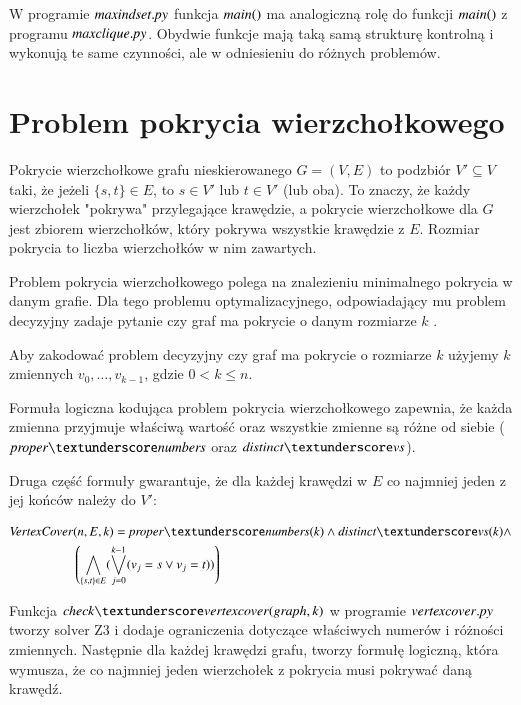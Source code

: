 

W programie ${\mathit{maxindset.py}}$ funkcja ${\mathit{main()}}$ ma analogiczną rolę do funkcji ${\mathit{main()}}$ z programu ${\mathit{maxclique.py}}$. Obydwie funkcje mają taką samą strukturę kontrolną i wykonują te same czynności, ale w odniesieniu do różnych problemów. 



\section{Problem pokrycia wierzchołkowego}
Pokrycie wierzchołkowe grafu nieskierowanego $G = (V, E)$ to podzbiór $V' \subseteq V$ taki, że jeżeli $\{s, t\} \in E$, to $s \in V'$ lub $t \in V'$ (lub oba). To znaczy, że każdy wierzchołek "pokrywa" przylegające krawędzie, a pokrycie wierzchołkowe dla \(G\) jest zbiorem wierzchołków, który pokrywa wszystkie krawędzie z \(E\). Rozmiar pokrycia to liczba wierzchołków w nim zawartych.

Problem pokrycia wierzchołkowego polega na znalezieniu minimalnego pokrycia w danym grafie. Dla tego problemu optymalizacyjnego, odpowiadający mu problem decyzyjny zadaje pytanie czy graf ma pokrycie o danym rozmiarze \(k\) \cite{CormenLRS0023376}.

Aby zakodować problem decyzyjny czy graf ma pokrycie o rozmiarze $k$ użyjemy $k$ zmiennych $v_0,\ldots,v_{k-1}$,
gdzie $0 < k \leq n$.

Formuła logiczna kodująca problem pokrycia wierzchołkowego zapewnia, że każda zmienna przyjmuje właściwą wartość oraz wszystkie zmienne są różne od siebie ($\propernumbers$ oraz $\distinctvs$).

Druga część formuły gwarantuje, że dla każdej krawędzi w $E$ co najmniej jeden z jej końców należy do $V'$:

\begin{align*}
	\VertexCover&(n, E, k) = \propernumbers(k) \land \distinctvs(k) \land \\
	&\left( \bigwedge_{\{s,t\} \in E} (\bigvee_{j=0}^{k-1} (v_j = s \lor v_j = t)) \right)	
\end{align*}

Funkcja $\checkvertexcover$ w programie ${\mathit{vertexcover.py}}$ tworzy solver Z3 i dodaje ograniczenia dotyczące właściwych numerów i różności zmiennych. Następnie dla każdej krawędzi grafu, tworzy formułę logiczną, która wymusza, że co najmniej jeden wierzchołek z pokrycia musi pokrywać daną krawędź.


